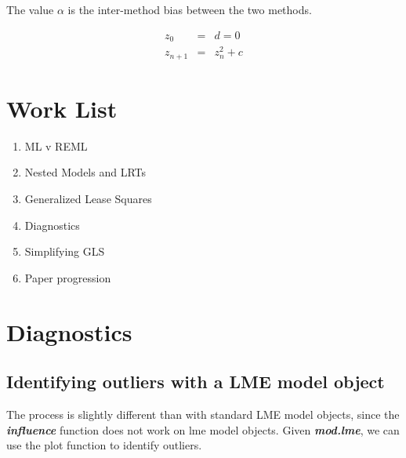\documentclass[12pt, a4paper]{report}
\theoremstyle{plain}
\theoremstyle{definition}
\theoremstyle{remark}
\begin{document}
The value $\alpha$ is the inter-method bias between the two
methods.

\begin{eqnarray}
z_0 &=& d = 0 \\
z_{n+1} &=& z_n^2+c
\end{eqnarray}






\section{Work List}
\begin{enumerate}
	\item ML v REML
	\item Nested Models and LRTs
	\item Generalized Lease Squares
	\item Diagnostics
	\item Simplifying GLS
	\item Paper progression
\end{enumerate}





\newpage
\section{Diagnostics}

\subsection{Identifying outliers with a LME model object}

The process is slightly different than with standard LME model objects, since the \textbf{\emph{influence}}
function does not work on lme model objects. Given \textbf{\emph{mod.lme}}, we can use the plot function to
identify outliers.
\end{document}

